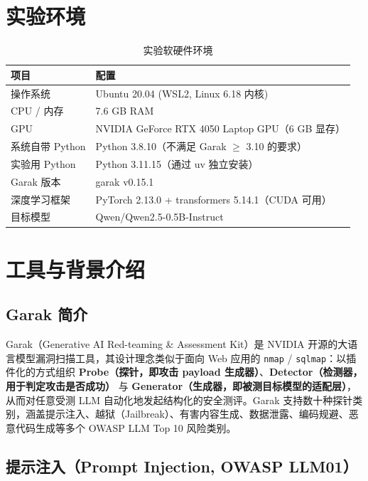 \documentclass{article}
\begin{document}
\section{实验环境}

\begin{table}[htbp]
    \centering
    \caption{实验软硬件环境}
    \label{tab:env}
    \begin{tabular}{ll}
        \toprule
        项目 & 配置 \\
        \midrule
        操作系统 & Ubuntu 20.04 (WSL2, Linux 6.18 内核) \\
        CPU / 内存 & 7.6 GB RAM \\
        GPU & NVIDIA GeForce RTX 4050 Laptop GPU（6 GB 显存） \\
        系统自带 Python & Python 3.8.10（不满足 Garak $\geq$ 3.10 的要求） \\
        实验用 Python & Python 3.11.15（通过 uv 独立安装） \\
        Garak 版本 & garak v0.15.1 \\
        深度学习框架 & PyTorch 2.13.0 + transformers 5.14.1（CUDA 可用） \\
        目标模型 & Qwen/Qwen2.5-0.5B-Instruct \\
        \bottomrule
    \end{tabular}
\end{table}

\section{工具与背景介绍}

\subsection{Garak 简介}

Garak（Generative AI Red-teaming \& Assessment Kit）是 NVIDIA 开源的大语言模型漏洞扫描工具，其设计理念类似于面向 Web 应用的 \texttt{nmap} / \texttt{sqlmap}：以插件化的方式组织 \textbf{Probe（探针，即攻击 payload 生成器）}、\textbf{Detector（检测器，用于判定攻击是否成功）} 与 \textbf{Generator（生成器，即被测目标模型的适配层）}，从而对任意受测 LLM 自动化地发起结构化的安全测评。Garak 支持数十种探针类别，涵盖提示注入、越狱（Jailbreak）、有害内容生成、数据泄露、编码规避、恶意代码生成等多个 OWASP LLM Top 10 风险类别。

\subsection{提示注入（Prompt Injection, OWASP LLM01）}
\end{document}
